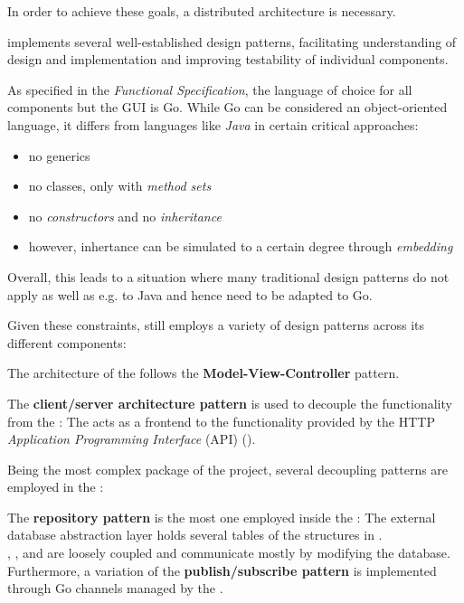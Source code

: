 In order to achieve these goals, a distributed architecture is necessary.

\mamid implements several well-established design patterns, facilitating understanding of design and implementation and improving
testability of individual components.

As specified in the \emph{Functional Specification}, the language of choice for all components but the GUI is Go.
While Go can be considered an object-oriented language, it differs from languages like \emph{Java} in certain critical approaches:
\begin{itemize}
  \item no generics
  \item no classes, only  with \emph{method sets}
  \item no \emph{constructors} and no \emph{inheritance}
  \item however, inhertance can be simulated to a certain degree through \emph{embedding} %
\end{itemize}

Overall, this leads to a situation where many traditional design patterns do not apply as well as e.g. to Java and hence need
to be adapted to Go.

Given these constraints, \mamid still employs a variety of design patterns across its different components:

The architecture of the  follows the \textbf{Model-View-Controller} pattern.

The \textbf{client/server architecture pattern} is used to decouple the  functionality from the :
The  acts as a frontend to the functionality provided by the  HTTP
\emph{Application Programming Interface} (API) ().

Being the most complex package of the project, several decoupling patterns are employed in the :

The \textbf{repository pattern} is the most one employed inside the :
The external  database abstraction layer holds several tables of the structures in .\\
,  ,
 and   are loosely coupled and communicate mostly by
modifying the database.\\
Furthermore, a variation of the \textbf{publish/subscribe pattern} is implemented through Go channels managed by the .

